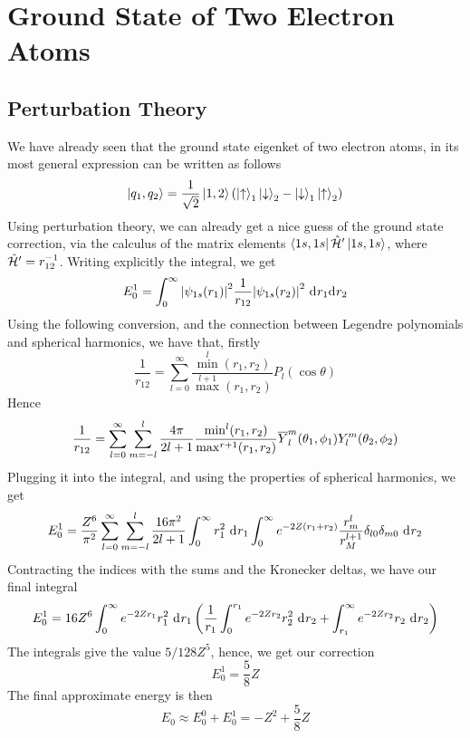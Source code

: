 \documentclass[../qm.tex]{subfiles}
\begin{document}
	\section{Ground State of Two Electron Atoms}
	\subsection{Perturbation Theory}
	We have already seen that the ground state eigenket of two electron atoms, in its most general expression can be written as follows
	\begin{equation}
		\ket{q_1,q_2}=\frac{1}{\sqrt{2}}\ket{1,2}\left( \ket{\uparrow}_1\ket{\downarrow}_2-\ket{\downarrow}_1\ket{\uparrow}_2 \right)
		\label{eq:2eminusatomgsstate}
	\end{equation}
	Using perturbation theory, we can already get a nice guess of the ground state correction, via the calculus of the matrix elements $\bra{1s,1s}\hat{\mathcal{H}}'\ket{1s,1s}$, where $\hat{\mathcal{H}}'=r_{12}^{-1}$. Writing explicitly the integral, we get
	\begin{equation}
		E_0^1=\int_{0}^{\infty}\abs{\psi_{1s}(r_1)}^2\frac{1}{r_{12}}\abs{\psi_{1s}(r_2)}^2\ \mathrm{d}^{}r_1\mathrm{d}^{}r_2
		\label{eq:ptgspert}
	\end{equation}
	Using the following conversion, and the connection between Legendre polynomials and spherical harmonics, we have that, firstly
	\begin{equation*}
		\frac{1}{r_{12}}=\sum_{l=0}^{\infty}\frac{\min^l(r_1,r_2)}{\max^{l+1}(r_1,r_2)}P_l(\cos\theta)
	\end{equation*}
	Hence
	\begin{equation*}
		\frac{1}{r_{12}}=\sum_{l=0}^{\infty}\sum_{m=-l}^l\frac{4\pi}{2l+1}\frac{\min^l(r_1,r_2)}{\max^{r+1}(r_1,r_2)}\overline{Y}^m_l(\theta_1,\phi_1)Y^m_l(\theta_2,\phi_2)
	\end{equation*}
	Plugging it into the integral, and using the properties of spherical harmonics, we get
	\begin{equation*}
		E_0^1=\frac{Z^6}{\pi^2}\sum_{l=0}^{\infty}\sum_{m=-l}^l\frac{16\pi^2}{2l+1}\int_{0}^{\infty}r_1^2\ \mathrm{d}^{}r_1\int_{0}^{\infty}e^{-2Z(r_1+r_2)}\frac{r_m^l}{r_M^{l+1}}\delta_{l0}\delta_{m0}\ \mathrm{d}^{}r_2
	\end{equation*}
	Contracting the indices with the sums and the Kronecker deltas, we have our final integral
	\begin{equation}
		E_0^1=16Z^6\int_{0}^{\infty}e^{-2Zr_1}r_1^2\ \mathrm{d}^{}r_1\left( \frac{1}{r_1}\int_{0}^{r_1}e^{-2Zr_2}r_2^2\ \mathrm{d}^{}r_2+\int_{r_1}^{\infty}e^{-2Zr_2}r_2\ \mathrm{d}^{}r_2 \right)
		\label{eq:energygshegspt}
	\end{equation}
	The integrals give the value $5/128 Z^5$, hence, we get our correction
	\begin{equation}
		E_0^1=\frac{5}{8}Z
		\label{eq:pthegscorr}
	\end{equation}
	The final approximate energy is then
	\begin{equation}
		E_0\approx E_0^0+E_0^1=-Z^2+\frac{5}{8}Z
		\label{eq:pthecorrtotal}
	\end{equation}
\end{document}
